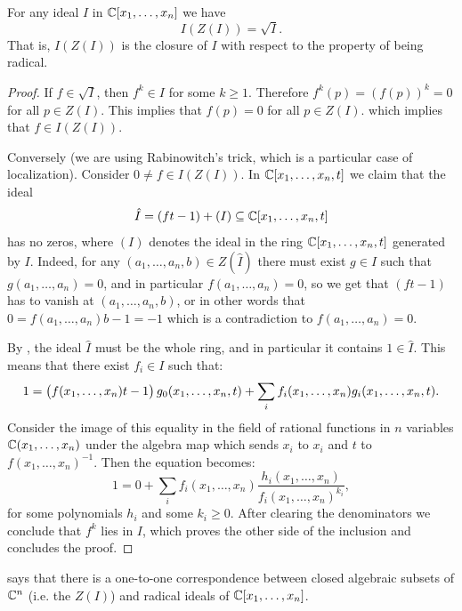 \documentclass[11pt,a4paper]{article}
\begin{document}
\begin{theorem}
  \label{thm:hilbert-nullstellensatz}
  For any ideal $I$ in $\mathbb{C}[x_1,\dots,x_n]$ we have
  \[
    I(Z(I)) = \sqrt{I}.
  \]
  That is, $I(Z(I))$ is the closure of $I$ with respect to the property
  of being radical.
\end{theorem}
\begin{proof}
  If $f \in \sqrt{I}$,
  then $f^k \in I$ for some $k \geq 1$.
  Therefore $f^k(p) = (f(p))^k = 0$ for all $p \in Z(I)$.
  This implies that $f(p) = 0$ for all $p \in Z(I)$.
  which implies that $f \in I(Z(I))$.

  Conversely (we are using Rabinowitch's trick, which is a particular case
  of localization).
  Consider $0 \neq f \in I(Z(I))$.
  In $\mathbb{C}[x_1,\dots,x_n,t]$ we claim that the ideal
  \[
    \hat I = (ft - 1) + (I) \subseteq \mathbb{C}[x_1,\dots,x_n,t]
  \]
  has no zeros, where $(I)$ denotes the ideal in the ring $\mathbb{C}[x_1,\dots,x_n,t]$
  generated by $I$.
  Indeed, for any $(a_1,\dots,a_n,b) \in Z(\hat I)$
  there must exist $g \in I$ such that $g(a_1,\dots,a_n) = 0$,
  and in particular $f(a_1,\dots,a_n) = 0$,
  so we get that $(ft - 1)$ has to vanish at $(a_1,\dots,a_n,b)$,
  or in other words that $0 = f(a_1,\dots,a_n) b - 1 = -1$
  which is a contradiction to $f(a_1,\dots,a_n) = 0$.
  
  By , the ideal $\hat I$ must be the whole
  ring, and in particular it contains $1 \in \hat I$.
  This means that there exist $f_i \in I$ such that:
  \[
    1 =
    \del{f(x_1,\dots,x_n) t - 1} g_0(x_1,\dots,x_n,t) +
    \sum_{i} f_i(x_1,\dots,x_n) g_i(x_1,\dots,x_n,t).
  \]
  Consider the image of this equality in the field of rational
  functions in $n$ variables $\mathbb{C}(x_1,\dots,x_n)$ under the algebra map
  which sends $x_i$ to $x_i$ and $t$ to $f(x_1,\dots,x_n)^{-1}$.
  Then the equation becomes:
  \[
    1 =
    0 +
    \sum_{i} f_i(x_1,\dots,x_n) \frac{h_i(x_1,\dots,x_n)}{f_i(x_1,\dots,x_n)^{k_i}},
  \]
  for some polynomials $h_i$ and some $k_i \geq 0$.
  After clearing the denominators we conclude that $f^k$ lies in $I$,
  which proves the other side of the inclusion and concludes the proof.
\end{proof}

\begin{remark}
   says that there is a one-to-one
  correspondence between closed algebraic subsets of $\mathbb{C}^n$ (i.e. the $Z(I)$)
  and radical ideals of $\mathbb{C}[x_1,\dots,x_n]$.
\end{remark}
\end{document}
